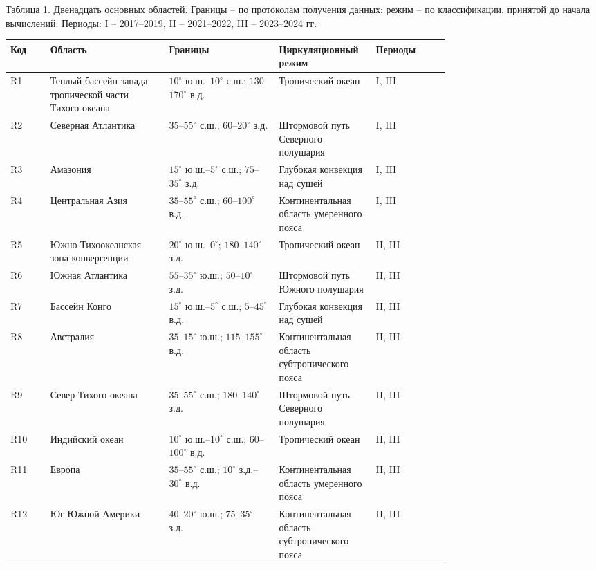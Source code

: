 \documentclass[12pt,a4paper]{article}
\begin{document}

\clearpage
\noindent Таблица 1. Двенадцать основных областей. Границы -- по протоколам получения данных; режим -- по классификации, принятой до начала вычислений. Периоды: I -- 2017--2019, II -- 2021--2022, III -- 2023--2024 гг.

\begin{singlespace}
\noindent\begin{tabular}{@{}l>{\raggedright\arraybackslash}p{0.27\linewidth}>{\raggedright\arraybackslash}p{0.25\linewidth}>{\raggedright\arraybackslash}p{0.22\linewidth}l@{}}
\toprule
Код & Область & Границы & Циркуляционный режим & Периоды\\
\midrule
R1 & Теплый бассейн запада тропической части Тихого океана & $10^\circ$ ю.ш.--$10^\circ$ с.ш.; $130$--$170^\circ$ в.д. & Тропический океан & I, III\\
R2 & Северная Атлантика & $35$--$55^\circ$ с.ш.; $60$--$20^\circ$ з.д. & Штормовой путь Северного полушария & I, III\\
R3 & Амазония & $15^\circ$ ю.ш.--$5^\circ$ с.ш.; $75$--$35^\circ$ з.д. & Глубокая конвекция над сушей & I, III\\
R4 & Центральная Азия & $35$--$55^\circ$ с.ш.; $60$--$100^\circ$ в.д. & Континентальная область умеренного пояса & I, III\\
R5 & Южно-Тихоокеанская зона конвергенции & $20^\circ$ ю.ш.--$0^\circ$; $180$--$140^\circ$ з.д. & Тропический океан & II, III\\
R6 & Южная Атлантика & $55$--$35^\circ$ ю.ш.; $50$--$10^\circ$ з.д. & Штормовой путь Южного полушария & II, III\\
R7 & Бассейн Конго & $15^\circ$ ю.ш.--$5^\circ$ с.ш.; $5$--$45^\circ$ в.д. & Глубокая конвекция над сушей & II, III\\
R8 & Австралия & $35$--$15^\circ$ ю.ш.; $115$--$155^\circ$ в.д. & Континентальная область субтропического пояса & II, III\\
R9 & Север Тихого океана & $35$--$55^\circ$ с.ш.; $180$--$140^\circ$ з.д. & Штормовой путь Северного полушария & II, III\\
R10 & Индийский океан & $10^\circ$ ю.ш.--$10^\circ$ с.ш.; $60$--$100^\circ$ в.д. & Тропический океан & II, III\\
R11 & Европа & $35$--$55^\circ$ с.ш.; $10^\circ$ з.д.--$30^\circ$ в.д. & Континентальная область умеренного пояса & II, III\\
R12 & Юг Южной Америки & $40$--$20^\circ$ ю.ш.; $75$--$35^\circ$ з.д. & Континентальная область субтропического пояса & II, III\\
\bottomrule
\end{tabular}
\end{singlespace}
\end{document}
